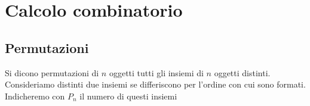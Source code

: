\chapter{Calcolo combinatorio}
\section{Permutazioni}
\begin{defn}
Si dicono permutazioni di $n$ oggetti tutti gli insiemi di $n$ oggetti distinti. Consideriamo distinti due insiemi se differiscono per l'ordine con cui sono formati. Indicheremo con $P_n$ il numero di questi insiemi
\end{defn}